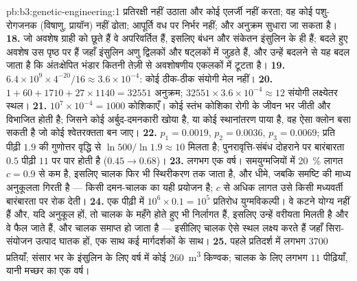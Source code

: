 \begin{solution}{pb:b3:genetic-engineering:1}
प्रतिरक्षी नहीं उठाता और कोई एलर्जी नहीं करता; वह कोई पशु-रोगजनक
(विषाणु, प्रायॉन) नहीं ढोता; आपूर्ति वध पर निर्भर नहीं; और अनुक्रम
सुधारा जा सकता है।
\textbf{18.} जो अवशेष ग्राही को छूते हैं वे अपरिवर्तित हैं, इसलिए बंधन
और संकेतन इंसुलिन के ही हैं; बदले हुए अवशेष उस पृष्ठ पर हैं जहाँ
इंसुलिन अणु द्विलकों और षट्लकों में जुड़ते हैं, और उन्हें बदलने से यह
बदल जाता है कि अंतःक्षेपित भंडार कितनी तेज़ी से अवशोषणीय एकलकों में
टूटता है।
\textbf{19.} $6.4\times 10^{9}\times 4^{-20}/16 \approx 3.6\times
10^{-4}$: कोई ठीक-ठीक संयोगी मेल नहीं।
\textbf{20.} $1 + 60 + 1710 + 27\times 1140 = \num{32551}$ अनुक्रम;
$\num{32551}\times 3.6\times 10^{-4} \approx 12$ संयोगी लक्ष्येतर
स्थल।
\textbf{21.} $10^{7}\times 10^{-4} = 1000$ कोशिकाएँ। कोई स्तंभ कोशिका
रोगी के जीवन भर जीती और विभाजित होती है; जिसने कोई अर्बुद-दमनकारी खोया
है, या कोई स्थानांतरण पाया है, वह ऐसा क्लोन बसा सकती है जो कोई
श्वेतरक्तता बन जाए।
\textbf{22.} $p_{1} = 0.0019$, $p_{2} = 0.0036$, $p_{3} = 0.0069$;
प्रति पीढ़ी $1.9$ की गुणोत्तर वृद्धि से $\ln 500/\ln 1.9
\approx 10$ मिलता है; पुनरावृत्ति-संबंध दोहराने पर बारंबारता $0.5$
पीढ़ी $11$ पर पार होती है ($0.45 \to 0.68$)।
\textbf{23.} लगभग एक वर्ष। समयुग्मजियों में \qty{20}{\%} लागत
$c = 0.9$ से कम है, इसलिए चालक फिर भी स्थिरीकरण तक जाता है, और धीमे,
जबकि समष्टि की माध्य अनुकूलता गिरती है --- किसी दमन-चालक का यही
प्रयोजन है; $c$ से अधिक लागत उसे किसी मध्यवर्ती बारंबारता पर रोक देती।
\textbf{24.} एक पीढ़ी में $10^{6}\times 0.1 = 10^{5}$ प्रतिरोध
युग्मविकल्पी। वे कटने योग्य नहीं हैं और, यदि अनुकूल हों, तो चालक के
महँगे होते हुए भी निर्लागत हैं, इसलिए उन्हें वरीयता मिलती है और वे फैल
जाते हैं, और चालक समाप्त हो जाता है --- इसीलिए चालक ऐसे स्थल लक्ष्य
करते हैं जहाँ सिरा-संयोजन उत्पाद घातक हों, एक साथ कई मार्गदर्शकों के साथ।
\textbf{25.} पहले प्रतिदर्श में लगभग $3700$ प्रतियाँ; संसार भर के
इंसुलिन के लिए वर्ष में कोई \qty{260}{m^3} किण्वक; चालक के लिए लगभग
$11$ पीढ़ियाँ, यानी मच्छर का एक वर्ष।
\end{solution}
